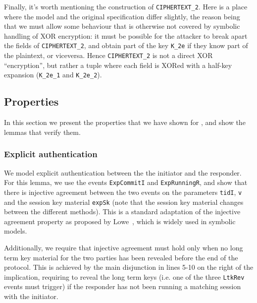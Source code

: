 Finally, it's worth mentioning the construction of
\lstinline{CIPHERTEXT_2}.
%
Here is a place where the model and the original specification differ
slightly, the reason being that we must allow some behaviour that is
otherwise not covered by symbolic handling of XOR encryption: it must
be possible for the attacker to break apart the fields of
\lstinline{CIPHERTEXT_2}, and obtain part of the key \lstinline{K_2e}
if they know part of the plaintext, or viceversa.
%
Hence \lstinline{CIPHERTEXT_2} is not a direct XOR ``encryption'', but
rather a tuple where each field is XORed with a half-key expansion
(\lstinline{K_2e_1} and \lstinline{K_2e_2}).



\subsection{Properties}
\label{sec:properties}

In this section we present the properties that we have shown for
\mEdhoc, and show the lemmas that verify them.

\subsubsection{Explicit authentication}

We model explicit authentication between the the initiator and the
responder.
%
For this lemma, we use the events \lstinline{ExpCommitI} and
\lstinline{ExpRunningR}, and show that there is injective agreement
between the two events on the parameters \lstinline{tidI},
\lstinline{v} and the session key material \lstinline{expSk} (note
that the session key material changes between the different \mEdhoc
methods).
%
This is a standard adaptation of the injective agreement property as
proposed by Lowe~\cite{lowes-paper}, which is widely used in symbolic
models.

Additionally, we require that injective agreement must hold only when
no long term key material for the two parties has been revealed before
the end of the protocol.
%
This is achieved by the main disjunction in lines 5-10 on the right of
the implication, requiring to reveal the long term keys (i.e. one of
the three \lstinline{LtkRev} events must trigger) if the responder has
not been running a matching session with the initiator.

